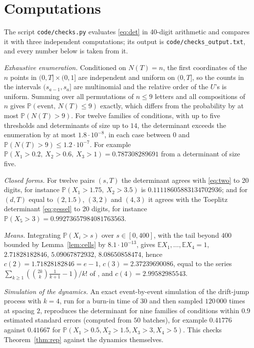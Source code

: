 \documentclass[11pt]{amsart}
\theoremstyle{remark}
\numberwithin{equation}{section}
\newcommand{\E}{\mathbb E}
\newcommand{\Pp}{\mathbb P}
\begin{document}
\section{Computations}\label{sec:comp}

The script \texttt{code/checks.py} evaluates \eqref{eq:det} in 40-digit arithmetic and compares it with three independent computations; its output is \texttt{code/checks\_output.txt}, and every number below is taken from it.

\emph{Exhaustive enumeration.} Conditioned on $N(T)=n$, the first coordinates of the $n$ points in $(0,T]\times(0,1]$ are independent and uniform on $(0,T]$, so the counts in the intervals $(s_{a-1},s_a]$ are multinomial and the relative order of the $U$'s is uniform. Summing over all permutations of $n\le9$ letters and all compositions of $n$ gives $\Pp(\text{event},\,N(T)\le9)$ exactly, which differs from the probability by at most $\Pp(N(T)>9)$. For twelve families of conditions, with up to five thresholds and determinants of size up to $14$, the determinant exceeds the enumeration by at most $1.8\cdot10^{-8}$, in each case between $0$ and $\Pp(N(T)>9)\le1.2\cdot10^{-7}$. For example $\Pp(X_1>0.2,\ X_2>0.6,\ X_3>1)=0.787308289691$ from a determinant of size five.

\emph{Closed forms.} For twelve pairs $(s,T)$ the determinant agrees with \eqref{eq:two} to 20 digits, for instance $\Pp(X_1>1.75,\ X_2>3.5)$ is
$0.11118605883134702936$; and for $(d,T)$ equal to $(2,1.5)$, $(3,2)$ and $(4,3)$ it agrees with the Toeplitz determinant \eqref{eq:gessel} to 20 digits, for instance $\Pp(X_5>3)=0.99273657984081763563$.

\emph{Means.} Integrating $\Pp(X_i>s)$ over $s\in[0,400]$, with the tail beyond $400$ bounded by Lemma~\ref{lem:cells} by $8.1\cdot10^{-13}$, gives $\E X_1,\dots,\E X_4=1$, $2.71828182846$, $5.09067872932$, $8.08650858474$, hence $c(2)=1.71828182846=e-1$, $c(3)=2.37239690086$, equal to the series $\sum_{k\ge1}(\binom{2k}{k}\frac1{k+1}-1)/k!$ of \cite[Proposition~9]{AD99}, and $c(4)=2.99582985543$.

\emph{Simulation of the dynamics.} An exact event-by-event simulation of the drift-jump process with $k=4$, run for a burn-in time of $30$ and then sampled $120\,000$ times at spacing $2$, reproduces the determinant for nine families of conditions within $0.9$ estimated standard errors (computed from $50$ batches), for example $0.41776$ against $0.41667$ for $\Pp(X_1>0.5,X_2>1.5,X_3>3,X_4>5)$. This checks Theorem~\ref{thm:rep} against the dynamics themselves.
\end{document}
